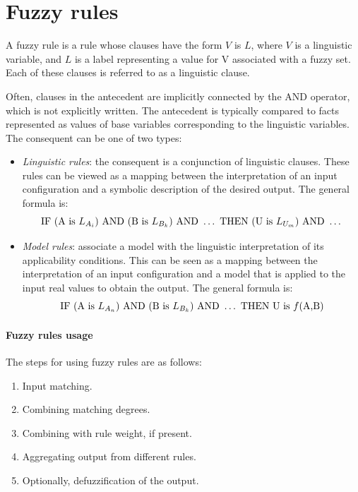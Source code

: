 \section{Fuzzy rules}

\begin{definition}
    A fuzzy rule is a rule whose clauses have the form $V$ is $L$, where $V$ is a linguistic variable, and $L$ is a label representing a value for V associated with a fuzzy set.
    Each of these clauses is referred to as a linguistic clause. 
\end{definition}
Often, clauses in the antecedent are implicitly connected by the AND operator, which is not explicitly written.
The antecedent is typically compared to facts represented as values of base variables corresponding to the linguistic variables. 
The consequent can be one of two types:
\begin{itemize}
    \item \textit{Linguistic rules}: the consequent is a conjunction of linguistic clauses. 
        These rules can be viewed as a mapping between the interpretation of an input configuration and a symbolic description of the desired output. 
        The general formula is:
        \[\textnormal{IF }(\textnormal{A is }L_{A_i})\textnormal{ AND }(\textnormal{B is }L_{B_k})\textnormal{ AND }\dots\textnormal{ THEN }(\textnormal{U is }L_{U_m})\textnormal{ AND }\dots\]
    \item \textit{Model rules}: associate a model with the linguistic interpretation of its applicability conditions. 
        This can be seen as a mapping between the interpretation of an input configuration and a model that is applied to the input real values to obtain the output. 
        The general formula is:
        \[\textnormal{IF }(\textnormal{A is }L_{A_n})\textnormal{ AND }(\textnormal{B is }L_{B_k})\textnormal{ AND }\dots\textnormal{ THEN } \textnormal{U is } f(\textnormal{A,B})\]
\end{itemize}

\paragraph*{Fuzzy rules usage}
The steps for using fuzzy rules are as follows:
\begin{enumerate}
    \item Input matching.
    \item Combining matching degrees.
    \item Combining with rule weight, if present.
    \item Aggregating output from different rules.
    \item Optionally, defuzzification of the output.
\end{enumerate}

